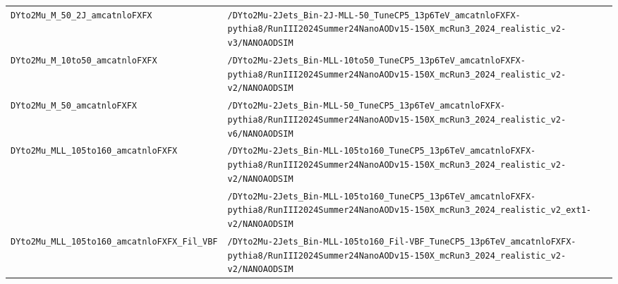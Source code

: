 \begin{longtable}{@{}>{\RaggedRight\arraybackslash}p{} >{\RaggedRight\arraybackslash}p{}@{}}
\addlinespace[2pt]
\texttt{DYto2Mu\_\allowbreak{}M\_\allowbreak{}50\_\allowbreak{}2J\_\allowbreak{}amcatnloFXFX} & \texttt{/\allowbreak{}DYto2Mu-\allowbreak{}2Jets\_\allowbreak{}Bin-\allowbreak{}2J-\allowbreak{}MLL-\allowbreak{}50\_\allowbreak{}TuneCP5\_\allowbreak{}13p6TeV\_\allowbreak{}amcatnloFXFX-\allowbreak{}pythia8/\allowbreak{}RunIII2024Summer24NanoAODv15-\allowbreak{}150X\_\allowbreak{}mcRun3\_\allowbreak{}2024\_\allowbreak{}realistic\_\allowbreak{}v2-\allowbreak{}v3/\allowbreak{}NANOAODSIM} \\
\addlinespace[2pt]
\texttt{DYto2Mu\_\allowbreak{}M\_\allowbreak{}10to50\_\allowbreak{}amcatnloFXFX} & \texttt{/\allowbreak{}DYto2Mu-\allowbreak{}2Jets\_\allowbreak{}Bin-\allowbreak{}MLL-\allowbreak{}10to50\_\allowbreak{}TuneCP5\_\allowbreak{}13p6TeV\_\allowbreak{}amcatnloFXFX-\allowbreak{}pythia8/\allowbreak{}RunIII2024Summer24NanoAODv15-\allowbreak{}150X\_\allowbreak{}mcRun3\_\allowbreak{}2024\_\allowbreak{}realistic\_\allowbreak{}v2-\allowbreak{}v2/\allowbreak{}NANOAODSIM} \\
\addlinespace[2pt]
\texttt{DYto2Mu\_\allowbreak{}M\_\allowbreak{}50\_\allowbreak{}amcatnloFXFX} & \texttt{/\allowbreak{}DYto2Mu-\allowbreak{}2Jets\_\allowbreak{}Bin-\allowbreak{}MLL-\allowbreak{}50\_\allowbreak{}TuneCP5\_\allowbreak{}13p6TeV\_\allowbreak{}amcatnloFXFX-\allowbreak{}pythia8/\allowbreak{}RunIII2024Summer24NanoAODv15-\allowbreak{}150X\_\allowbreak{}mcRun3\_\allowbreak{}2024\_\allowbreak{}realistic\_\allowbreak{}v2-\allowbreak{}v6/\allowbreak{}NANOAODSIM} \\
\addlinespace[2pt]
\texttt{DYto2Mu\_\allowbreak{}MLL\_\allowbreak{}105to160\_\allowbreak{}amcatnloFXFX} & \texttt{/\allowbreak{}DYto2Mu-\allowbreak{}2Jets\_\allowbreak{}Bin-\allowbreak{}MLL-\allowbreak{}105to160\_\allowbreak{}TuneCP5\_\allowbreak{}13p6TeV\_\allowbreak{}amcatnloFXFX-\allowbreak{}pythia8/\allowbreak{}RunIII2024Summer24NanoAODv15-\allowbreak{}150X\_\allowbreak{}mcRun3\_\allowbreak{}2024\_\allowbreak{}realistic\_\allowbreak{}v2-\allowbreak{}v2/\allowbreak{}NANOAODSIM} \\
 & \texttt{/\allowbreak{}DYto2Mu-\allowbreak{}2Jets\_\allowbreak{}Bin-\allowbreak{}MLL-\allowbreak{}105to160\_\allowbreak{}TuneCP5\_\allowbreak{}13p6TeV\_\allowbreak{}amcatnloFXFX-\allowbreak{}pythia8/\allowbreak{}RunIII2024Summer24NanoAODv15-\allowbreak{}150X\_\allowbreak{}mcRun3\_\allowbreak{}2024\_\allowbreak{}realistic\_\allowbreak{}v2\_\allowbreak{}ext1-\allowbreak{}v2/\allowbreak{}NANOAODSIM} \\
\addlinespace[2pt]
\texttt{DYto2Mu\_\allowbreak{}MLL\_\allowbreak{}105to160\_\allowbreak{}amcatnloFXFX\_\allowbreak{}Fil\_\allowbreak{}VBF} & \texttt{/\allowbreak{}DYto2Mu-\allowbreak{}2Jets\_\allowbreak{}Bin-\allowbreak{}MLL-\allowbreak{}105to160\_\allowbreak{}Fil-\allowbreak{}VBF\_\allowbreak{}TuneCP5\_\allowbreak{}13p6TeV\_\allowbreak{}amcatnloFXFX-\allowbreak{}pythia8/\allowbreak{}RunIII2024Summer24NanoAODv15-\allowbreak{}150X\_\allowbreak{}mcRun3\_\allowbreak{}2024\_\allowbreak{}realistic\_\allowbreak{}v2-\allowbreak{}v2/\allowbreak{}NANOAODSIM} \\

\end{longtable}
